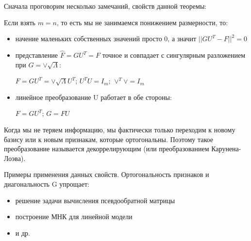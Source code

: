 Сначала проговорим несколько замечаний, свойств данной теоремы:\par
Если взять $m=n$, то есть мы не занимаемся понижением размерности, то: \par
\begin{itemize}
    \item начение маленьких собственных значений просто 0, а значит $||GU^T - F||^2 = 0$
    \item представление $\hat{F}=GU^T=F$ точное и совпадает с сингулярным разложением при $G=\vee\sqrt{\Lambda}$:\par
    $F=GU^T=\vee\sqrt{\Lambda}U^T$; $U^TU=I_m$; $\vee^T\vee=I_m$
    \item линейное преобразование U работает в обе стороны: \par
    $F=GU^T$; $G=FU$ \par
\end{itemize}\par
Когда мы не теряем информацию, мы фактически только переходим к новому базису или к новым признакам, которые ортогональны. Поэтому такое преобразование называется декоррелирующим (или преобразованием Карунена-Лоэва).

    
Примеры применения данных свойств. Ортогональность признаков и диагональность G упрощает:
\begin{itemize}
    \item решение задачи вычисления псевдообратной матрицы
    \item построение МНК для линейной модели
    \item и др.
\end{itemize}

